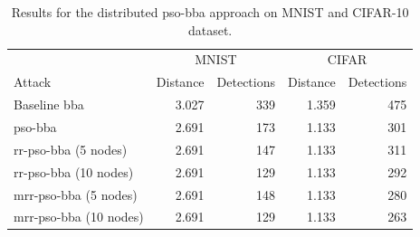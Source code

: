 \begin{table}
	\centering
	\caption[Distributed PSO-BBA results]{Results for the distributed \gls{pso}-\gls{bba} approach on MNIST and CIFAR-10 dataset.}
	\label{tbl:d_pso_bba}
	\begin{tabular}{lrrrr}\toprule
			& \multicolumn{2}{c}{MNIST} &\multicolumn{2}{c}{CIFAR} \\ \cmidrule(r){2-3} \cmidrule(r){4-5}
	Attack				&Distance	&Detections	&Distance	&Detections \\ \midrule
	Baseline \gls{bba}	&3.027		&339		&1.359			&475 \\
	\gls{pso}-\gls{bba} 	&2.691			&173			&1.133				&301 \\ 
	\gls{rr}-\gls{pso}-\gls{bba} (5 nodes) &2.691	&147	&1.133	&311 \\
	\gls{rr}-\gls{pso}-\gls{bba} (10 nodes) &2.691	&129	&1.133	&292 \\	
	\gls{mrr}-\gls{pso}-\gls{bba} (5 nodes)	&2.691			&148			&1.133				&280 \\
	\gls{mrr}-\gls{pso}-\gls{bba} (10 nodes)	&2.691			&129			&1.133				&263 \\
	\bottomrule
	\end{tabular}
\end{table}

